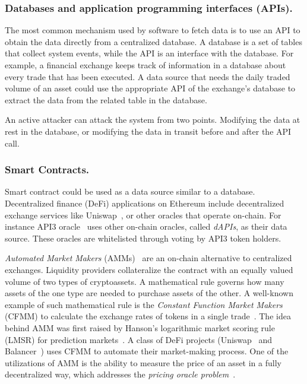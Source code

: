\subsubsection{Databases and application programming interfaces (APIs).} 

The most common mechanism used by software to fetch data is to use an API to obtain the data directly from a centralized database. A database is a set of tables that collect system events, while the API is an interface with the database. For example, a financial exchange keeps track of information in a database about every trade that has been executed. A data source that needs the daily traded volume of an asset could use the appropriate API of the exchange's database to extract the data from the related table in the database.

An active attacker can attack the system from two points. Modifying the data at rest in the database, or modifying the data in transit before and after the API call. 

\subsubsection{Smart Contracts.}

Smart contract could be used as a data source similar to a database. Decentralized finance (DeFi) applications on Ethereum include decentralized exchange services like Uniswap~\cite{adams2019uniswap}, or other oracles that operate on-chain. For instance API3 oracle~\cite{benligiraydecentralized} uses other on-chain oracles, called \textit{dAPIs}, as their data source. These oracles are whitelisted through voting by API3 token holders.

\textit{Automated Market Makers} (AMMs)~\cite{wang2020automated} are an on-chain alternative to centralized exchanges. Liquidity providers collateralize the contract with an equally valued volume of two types of cryptoassets. A mathematical rule governs how many assets of the one type are needed to purchase assets of the other. A well-known example of such mathematical rule is the \textit{Constant Function Market Makers} (CFMM) to calculate the exchange rates of tokens in a single trade~\cite{uniswapexplained}. The idea behind AMM was first raised by Hanson's logarithmic market scoring rule (LMSR) for prediction markets~\cite{hanson2003combinatorial}. A class of DeFi projects (\eg Uniswap~\cite{adams2019uniswap,adams2021uniswap} and Balancer~\cite{balancer}) uses CFMM to automate their market-making process. One of the utilizations of AMM is the ability to measure the price of an asset in a fully decentralized way, which addresses the \textit{pricing oracle problem}~\cite{angeris2020improved}.


